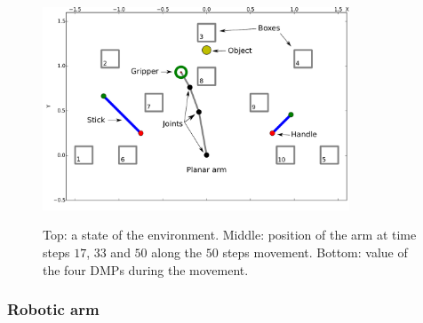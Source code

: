 \documentclass[10pt,letterpaper]{article}
\begin{document}
		\begin{figure}[h]
			\centering
			\hspace{-0.73cm}
			\vspace{-0.59cm}
			\includegraphics[width=9.12cm]{./include/tools.pdf}
			\\
			\hspace{-0.42cm}
			\caption{Top: a state of the environment. Middle: position of the arm at time steps $17$, $33$ and $50$ along the $50$ steps movement. Bottom: value of the four DMPs during the movement.}
			\label{env}
		\end{figure}

		\subsubsection{Robotic arm}
		
\end{document}
